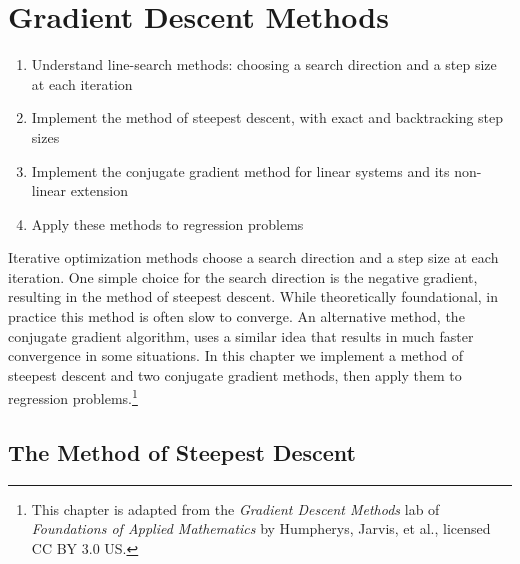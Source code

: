 \chapter{Gradient Descent Methods}
\label{ch:gradient-methods}

\begin{outcome}
\begin{enumerate}
\item Understand line-search methods: choosing a search direction and a step size at each iteration
\item Implement the method of steepest descent, with exact and backtracking step sizes
\item Implement the conjugate gradient method for linear systems and its non-linear extension
\item Apply these methods to regression problems
\end{enumerate}
\end{outcome}

Iterative optimization methods choose a search direction and a step size at each iteration.
One simple choice for the search direction is the negative gradient, resulting in the method of steepest descent.
While theoretically foundational, in practice this method is often slow to converge.
An alternative method, the conjugate gradient algorithm, uses a similar idea that results in much faster convergence in some situations.
In this chapter we implement a method of steepest descent and two conjugate gradient methods, then apply them to regression problems.\footnote{This chapter is adapted from the \emph{Gradient Descent Methods} lab of \emph{Foundations of Applied Mathematics} by Humpherys, Jarvis, et al., licensed CC BY 3.0 US.}

\section{The Method of Steepest Descent} %

